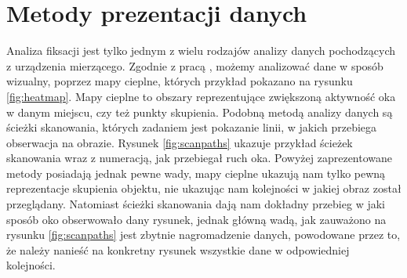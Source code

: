 \section{Metody prezentacji danych}
\label{sec:othereyetracking}
Analiza fiksacji jest tylko jednym z wielu rodzajów analizy danych pochodzących z urządzenia mierzącego. Zgodnie z pracą \cite[rozdział 2.2]{OtherEyetrack}, możemy analizować dane w sposób wizualny, poprzez mapy cieplne, których przykład pokazano na rysunku \ref{fig:heatmap}. Mapy cieplne to obszary reprezentujące zwiększoną aktywność oka w danym miejscu, czy też punkty skupienia. Podobną metodą analizy danych są ścieżki skanowania, których zadaniem jest pokazanie linii, w jakich przebiega obserwacja na obrazie. Rysunek \ref{fig:scanpaths} ukazuje przykład ścieżek skanowania wraz z numeracją, jak przebiegał ruch oka. Powyżej zaprezentowane metody posiadają jednak pewne wady, mapy cieplne ukazują nam tylko pewną reprezentacje skupienia objektu, nie ukazując nam kolejności w jakiej obraz został przeglądany. Natomiast ścieżki skanowania dają nam dokładny przebieg w jaki sposób oko obserwowało dany rysunek, jednak główną wadą, jak zauważono na rysunku \ref{fig:scanpaths} jest zbytnie nagromadzenie danych, powodowane przez to, że należy nanieść na konkretny rysunek wszystkie dane w odpowiedniej kolejności.
